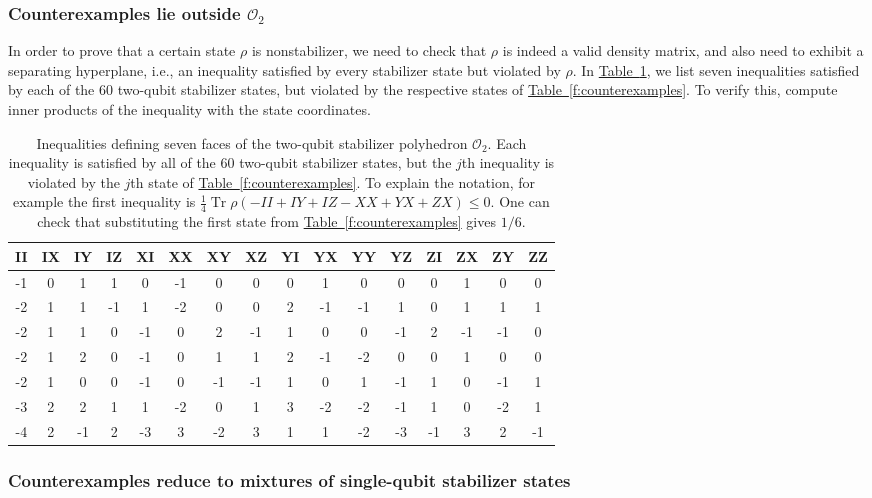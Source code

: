 \documentclass[11pt]{article}
\DeclareMathOperator{\tr}{Tr}%
\theoremstyle{note}
\newcommand{\tabref}[1]{\hyperref[#1]{{Table~\ref*{#1}}}}
\begin{document}
\subsubsection{Counterexamples lie outside $\mathcal O_2$}

In order to prove that a certain state $\rho$ is nonstabilizer, we need to check that $\rho$ is indeed a valid density matrix, and also need to exhibit a separating hyperplane, i.e., an inequality satisfied by every stabilizer state but violated by $\rho$.  In \tabref{f:hyperplanes}, we list seven inequalities satisfied by each of the $60$ two-qubit stabilizer states, but violated by the respective states of \tabref{f:counterexamples}.  To verify this, compute inner products of the inequality with the state coordinates.  

\begin{table}
\caption{Inequalities defining seven faces of the two-qubit stabilizer polyhedron $\mathcal O_2$.  Each inequality is satisfied by all of the $60$ two-qubit stabilizer states, but the $j$th inequality is violated by the $j$th state of \tabref{f:counterexamples}.  To explain the notation, for example the first inequality is $\tfrac{1}{4} \tr \rho (-II + IY + IZ - XX + YX + ZX) \leq 0$.  One can check that substituting the first state from \tabref{f:counterexamples} gives $1/6$.}\label{f:hyperplanes}
\centering
\begin{tabular}{c @{\quad} c @{\quad} c @{\quad} c @{\quad} c @{\quad} c @{\quad} c @{\quad} c @{\quad} c @{\quad} c @{\quad} c @{\quad} c @{\quad} c @{\quad} c @{\quad} c @{\quad} c}
\hline \hline
II&IX&IY&IZ&XI&XX&XY&XZ&YI&YX&YY&YZ&ZI&ZX&ZY&ZZ\\
\hline
-1& 0& 1& 1& 0&-1& 0& 0& 0& 1& 0& 0& 0& 1& 0& 0 \\
-2& 1& 1&-1& 1&-2& 0& 0& 2&-1&-1& 1& 0& 1& 1& 1 \\
-2& 1& 1& 0&-1& 0& 2&-1& 1& 0& 0&-1& 2&-1&-1& 0 \\
-2& 1& 2& 0&-1& 0& 1& 1& 2&-1&-2& 0& 0& 1& 0& 0 \\
-2& 1& 0& 0&-1& 0&-1&-1& 1& 0& 1&-1& 1& 0&-1& 1 \\
-3& 2& 2& 1& 1&-2& 0& 1& 3&-2&-2&-1& 1& 0&-2& 1 \\
-4& 2&-1& 2&-3& 3&-2& 3& 1& 1&-2&-3&-1& 3& 2&-1 \\
\hline \hline
\end{tabular}
\end{table}

\subsubsection{Counterexamples reduce to mixtures of single-qubit stabilizer states} \label{s:counterexamplesreduce}
\end{document}
